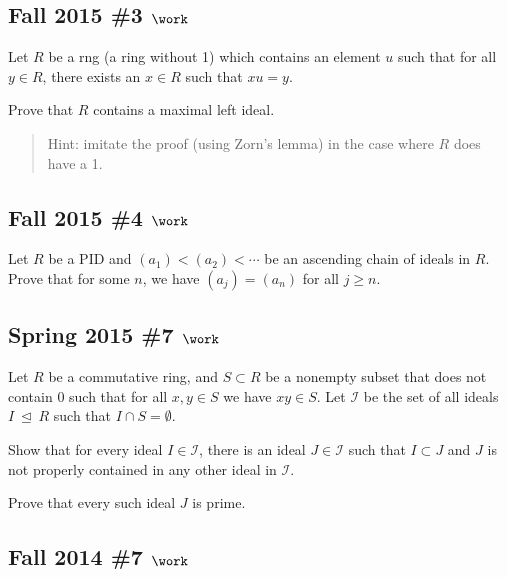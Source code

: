 \hypertarget{fall-2015-3-work}{%
\subsection{\texorpdfstring{Fall 2015 \#3
\(\work\)}{Fall 2015 \#3 \textbackslash work}}\label{fall-2015-3-work}}

Let \(R\) be a rng (a ring without 1) which contains an element \(u\)
such that for all \(y\in R\), there exists an \(x\in R\) such that
\(xu=y\).

Prove that \(R\) contains a maximal left ideal.

\begin{quote}
Hint: imitate the proof (using Zorn's lemma) in the case where \(R\)
does have a 1.
\end{quote}

\hypertarget{fall-2015-4-work}{%
\subsection{\texorpdfstring{Fall 2015 \#4
\(\work\)}{Fall 2015 \#4 \textbackslash work}}\label{fall-2015-4-work}}

Let \(R\) be a PID and \((a_1) < (a_2) < \cdots\) be an ascending chain
of ideals in \(R\). Prove that for some \(n\), we have \((a_j) = (a_n)\)
for all \(j\geq n\).

\hypertarget{spring-2015-7-work}{%
\subsection{\texorpdfstring{Spring 2015 \#7
\(\work\)}{Spring 2015 \#7 \textbackslash work}}\label{spring-2015-7-work}}

Let \(R\) be a commutative ring, and \(S\subset R\) be a nonempty subset
that does not contain 0 such that for all \(x, y\in S\) we have
\(xy\in S\). Let \({\mathcal{I}}\) be the set of all ideals
\(I{~\trianglelefteq~}R\) such that \(I\cap S = \emptyset\).

Show that for every ideal \(I\in {\mathcal{I}}\), there is an ideal
\(J\in {\mathcal{I}}\) such that \(I\subset J\) and \(J\) is not
properly contained in any other ideal in \({\mathcal{I}}\).

Prove that every such ideal \(J\) is prime.

\hypertarget{fall-2014-7-work}{%
\subsection{\texorpdfstring{Fall 2014 \#7
\(\work\)}{Fall 2014 \#7 \textbackslash work}}\label{fall-2014-7-work}}

